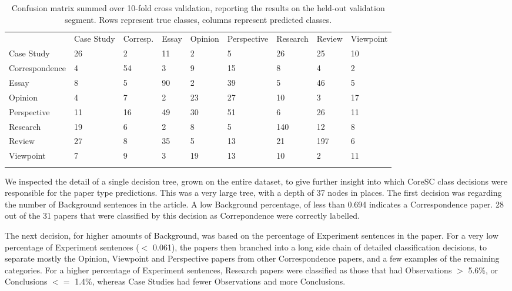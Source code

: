 \documentclass{svmult}
\begin{document}
\begin{table}
\caption{Confusion matrix summed over 10-fold cross validation, reporting the results on the held-out validation segment. Rows represent true classes, columns represent predicted classes.}
\label{tab:confusion}       %
\begin{tabular}{lllllllll}
\hline\noalign{\smallskip}
      &  Case Study   &     Corresp.      &   Essay  & Opinion &     Perspective    &     Research    &     Review  & Viewpoint \\
\noalign{\smallskip}\svhline\noalign{\smallskip}
Case Study    &    26   &     2     &   11    &    2  &      5 & 26       & 25 &       10 \\
Correspondence  &      4  &      54   &     3    &    9     &   15 & 8   &     4 &       2 \\
Essay      &  8     &   5    &   90    &    2 &       39      &  5 & 46    &    5 \\
Opinion    &    4   &     7 &       2   &     23      &  27     &   10   &  3  &      17 \\
Perspective &       11  &      16    &    49       & 30      &  51 & 6      &  26    &   11 \\
Research      &  19    &    6 &       2 &       8    &    5      &  140  &   12    &    8\\
Review       & 27     &   8     &   35    &    5      &  13    &    21   &  197 &       6\\
Viewpoint    &    7  &      9   &     3     &   19     &   13 & 10     &   2  &      11 \\
\noalign{\smallskip}\hline\noalign{\smallskip}
\end{tabular}
\end{table}




We inspected the detail of a single decision tree, grown on the entire dataset, to give further insight into which CoreSC class decisions were responsible for the paper type predictions. This was a very large tree, with a depth of 37 nodes in places.  The first decision was regarding the number of Background sentences in the article. A low Background percentage, of less than 0.694 indicates a Correspondence paper. 28 out of the 31 papers that were classified by this decision as Correpondence were correctly labelled. 

The next decision, for higher amounts of Background, was based on the
percentage of Experiment sentences in the paper. For a very low
percentage of Experiment sentences ($<$ 0.061), the papers then
branched into a long side chain of detailed classification decisions,
to separate mostly the Opinion, Viewpoint and Perspective papers from
other Correspondence papers, and a few examples of the remaining
categories. For a higher percentage of Experiment sentences, Research
papers were classified as those that had Observations $>$ 5.6\%, or
Conclusions $<=$ 1.4\%, whereas Case Studies had fewer Observations
and more Conclusions.
\end{document}
